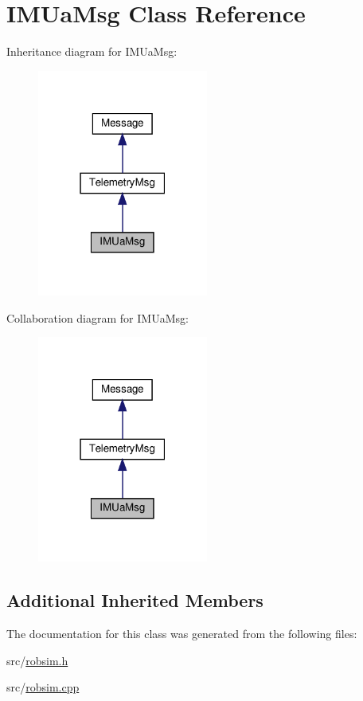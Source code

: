 \hypertarget{classIMUaMsg}{}\section{I\+M\+Ua\+Msg Class Reference}
\label{classIMUaMsg}


Inheritance diagram for I\+M\+Ua\+Msg\+:\nopagebreak
\begin{figure}[H]
\begin{center}
\leavevmode
\includegraphics[width=159pt]{classIMUaMsg__inherit__graph}
\end{center}
\end{figure}


Collaboration diagram for I\+M\+Ua\+Msg\+:\nopagebreak
\begin{figure}[H]
\begin{center}
\leavevmode
\includegraphics[width=159pt]{classIMUaMsg__coll__graph}
\end{center}
\end{figure}
\subsection*{Additional Inherited Members}


The documentation for this class was generated from the following files\+:\begin{DoxyCompactItemize}
\item 
src/\hyperlink{robsim_8h}{robsim.\+h}\item 
src/\hyperlink{robsim_8cpp}{robsim.\+cpp}\end{DoxyCompactItemize}
